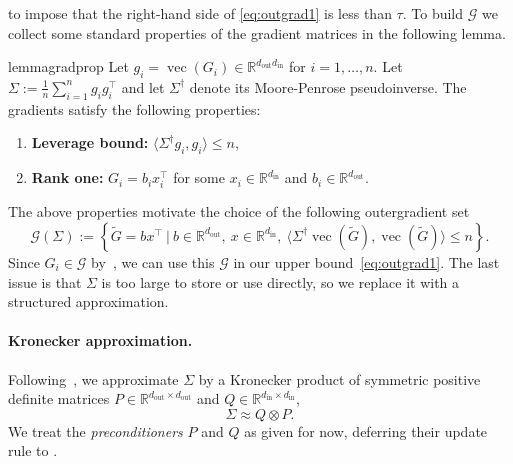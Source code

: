 \documentclass[11pt]{article}
\renewcommand{\vec}{\operatorname{vec}}
\newcommand{\R}{\mathbb{R}}
\newcommand{\ip}[1]{\langle #1 \rangle}
\theoremstyle{plain}
\theoremstyle{definition}
\theoremstyle{remark}
\theoremstyle{definition}
\begin{document}
to impose  that the right-hand side of \eqref{eq:outgrad1} 
is less than $\tau$. 
To build $\mathcal{G}$ we collect some standard properties of the gradient matrices in the following lemma.
\begin{restatable}{lemma}{gradprop} 
  \label{lem:gradprop}
    Let $g_i=\vec(G_i) \in \R^{d_{\mathrm{out}} d_{\mathrm{in}}}$ for $i=1, \ldots, n$. Let $\Sigma := \frac{1}{n} \sum_{i=1}^n g_i g_i^\top$ and let $\Sigma^\dagger$ denote its Moore-Penrose pseudoinverse. The gradients satisfy the following properties:
    \begin{enumerate}
        \item {\bf Leverage bound:} $ \ip{\Sigma^\dagger g_i, g_i} \leq n$, \\[-0.5cm]
        \item {\bf Rank one:} $G_i = b_i x_i^\top$  for some $x_i \in \R^{d_{\mathrm{in}}}$ and $b_i \in \R^{d_{\mathrm{out}}}$.
        \end{enumerate}
\end{restatable}

\noindent The above properties motivate the choice of the following outergradient set
\begin{equation} 
\label{eq:outgrad} 
\mathcal{G}(\Sigma) := \left \{ \widetilde{G} = b x^\top ~\bigg |~  
b\in\mathbb{R}^{d_{\mathrm{out}}},
    \ x\in\mathbb{R}^{d_{\mathrm{in}}}, \
\ip{\Sigma^\dagger \vec(\widetilde{G}), \vec(\widetilde{G})} \leq n \right \}.
\end{equation}
Since $G_i \in \mathcal{G}$ by~, we can use this $\mathcal{G}$ in our upper bound~\eqref{eq:outgrad1}.
The last issue is that $\Sigma$ is too large to store or use directly, so we replace it with a structured approximation.

\paragraph{Kronecker approximation.}
Following~\cite{shampoo,kfac}, we approximate $\Sigma$ by a Kronecker product of symmetric positive definite matrices $P\in \R^{d_{\mathrm{out}} \times d_{\mathrm{out}}}$ and $Q \in\R^{d_{\mathrm{in}} \times d_{\mathrm{in}}}$,
\begin{equation} \label{eq:pq-factor}
     \Sigma  \approx Q \otimes P.
\end{equation}
We treat the \emph{preconditioners} $P$ and $Q$ as given for now, deferring their update rule to .
\end{document}
